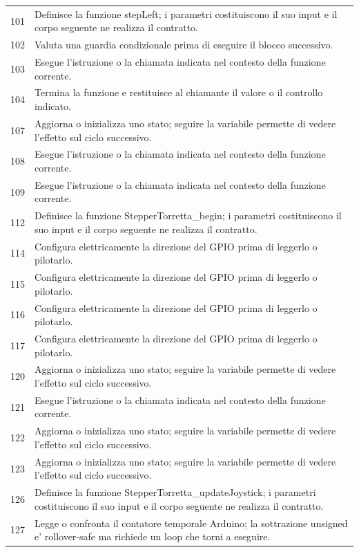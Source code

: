 \documentclass[11pt,a4paper]{article}
\begin{document}
\begin{longtable}{p{}p{}}
101 & Definisce la funzione stepLeft; i parametri costituiscono il suo input e il corpo seguente ne realizza il contratto. \\
102 & Valuta una guardia condizionale prima di eseguire il blocco successivo. \\
103 & Esegue l'istruzione o la chiamata indicata nel contesto della funzione corrente. \\
104 & Termina la funzione e restituisce al chiamante il valore o il controllo indicato. \\
107 & Aggiorna o inizializza uno stato; seguire la variabile permette di vedere l'effetto sul ciclo successivo. \\
108 & Esegue l'istruzione o la chiamata indicata nel contesto della funzione corrente. \\
109 & Esegue l'istruzione o la chiamata indicata nel contesto della funzione corrente. \\
112 & Definisce la funzione StepperTorretta\_\allowbreak{}begin; i parametri costituiscono il suo input e il corpo seguente ne realizza il contratto. \\
114 & Configura elettricamente la direzione del GPIO prima di leggerlo o pilotarlo. \\
115 & Configura elettricamente la direzione del GPIO prima di leggerlo o pilotarlo. \\
116 & Configura elettricamente la direzione del GPIO prima di leggerlo o pilotarlo. \\
117 & Configura elettricamente la direzione del GPIO prima di leggerlo o pilotarlo. \\
120 & Aggiorna o inizializza uno stato; seguire la variabile permette di vedere l'effetto sul ciclo successivo. \\
121 & Esegue l'istruzione o la chiamata indicata nel contesto della funzione corrente. \\
122 & Aggiorna o inizializza uno stato; seguire la variabile permette di vedere l'effetto sul ciclo successivo. \\
123 & Aggiorna o inizializza uno stato; seguire la variabile permette di vedere l'effetto sul ciclo successivo. \\
126 & Definisce la funzione StepperTorretta\_\allowbreak{}updateJoystick; i parametri costituiscono il suo input e il corpo seguente ne realizza il contratto. \\
127 & Legge o confronta il contatore temporale Arduino; la sottrazione unsigned e' rollover-safe ma richiede un loop che torni a eseguire. \\

\end{longtable}
\end{document}
